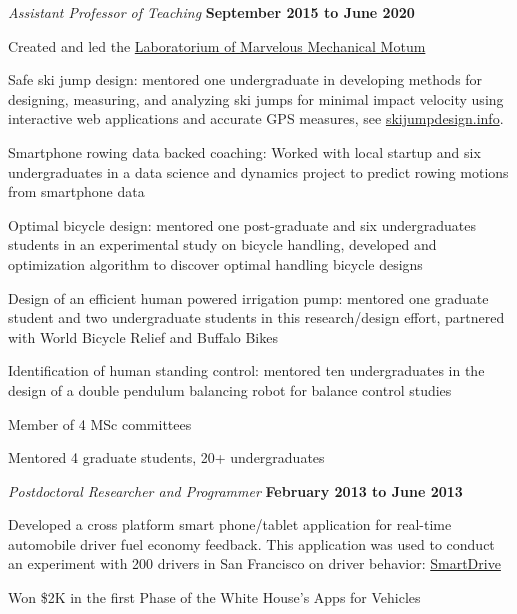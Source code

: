 \documentclass[10pt]{article}
\newenvironment{outerlist}[1][\enskip\textbullet]%
        {\begin{itemize}[#1]}{\end{itemize}%
         \vspace{-.6\baselineskip}}
\newenvironment{innerlist}[1][\enskip\textbullet]%
        {\begin{compactitem}[#1]}{\end{compactitem}}
\begin{document}
\begin{outerlist}
  \item[] \textit{Assistant Professor of Teaching}%
        \hfill \textbf{September 2015 to June 2020}
  \begin{innerlist}
    \item Created and led the \href{http://mechmotum.github.io}{Laboratorium of
      Marvelous Mechanical Motum}
    \item Safe ski jump design: mentored one undergraduate in developing
      methods for designing, measuring, and analyzing ski jumps for minimal
      impact velocity using interactive web applications and accurate GPS
      measures, see \href{http://www.skijumpdesign.info}{skijumpdesign.info}.
    \item Smartphone rowing data backed coaching: Worked with local startup and
      six undergraduates in a data science and dynamics project to predict
      rowing motions from smartphone data
    \item Optimal bicycle design: mentored one post-graduate and six
      undergraduates students in an experimental study on bicycle handling,
      developed and optimization algorithm to discover optimal handling bicycle
      designs
    \item Design of an efficient human powered irrigation pump: mentored one
      graduate student and two undergraduate students in this research/design
      effort, partnered with World Bicycle Relief and Buffalo Bikes
    \item Identification of human standing control: mentored ten undergraduates
      in the design of a double pendulum balancing robot for balance control
      studies
    \item Member of 4 MSc committees
    \item Mentored 4 graduate students, 20+ undergraduates
  \end{innerlist}
  \item[] \textit{Postdoctoral Researcher and Programmer}%
        \hfill \textbf{February 2013 to June 2013}
  \begin{innerlist}
    \item Developed a cross platform smart phone/tablet application for
      real-time automobile driver fuel economy feedback. This application was
      used to conduct an experiment with 200 drivers in San Francisco on driver
      behavior: \href{http://smartdrive.ucdavis.edu}{SmartDrive}
    \item Won \$2K in the first Phase of the White House's Apps for Vehicles

\end{innerlist}
\end{outerlist}
\end{document}
